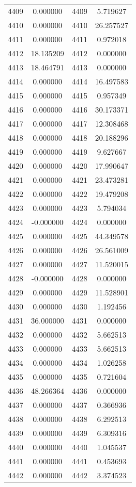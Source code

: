 \documentclass[12pt]{article}
\begin{document}
\begin{longtable}{@{}cccc@{}}
4409 & 0.000000 & 4409 & 5.719627 \\
4410 & 0.000000 & 4410 & 26.257527 \\
4411 & 0.000000 & 4411 & 0.972018 \\
4412 & 18.135209 & 4412 & 0.000000 \\
4413 & 18.464791 & 4413 & 0.000000 \\
4414 & 0.000000 & 4414 & 16.497583 \\
4415 & 0.000000 & 4415 & 0.957349 \\
4416 & 0.000000 & 4416 & 30.173371 \\
4417 & 0.000000 & 4417 & 12.308468 \\
4418 & 0.000000 & 4418 & 20.188296 \\
4419 & 0.000000 & 4419 & 9.627667 \\
4420 & 0.000000 & 4420 & 17.990647 \\
4421 & 0.000000 & 4421 & 23.473281 \\
4422 & 0.000000 & 4422 & 19.479208 \\
4423 & 0.000000 & 4423 & 5.794034 \\
4424 & -0.000000 & 4424 & 0.000000 \\
4425 & 0.000000 & 4425 & 44.349578 \\
4426 & 0.000000 & 4426 & 26.561009 \\
4427 & 0.000000 & 4427 & 11.520015 \\
4428 & -0.000000 & 4428 & 0.000000 \\
4429 & 0.000000 & 4429 & 11.528901 \\
4430 & 0.000000 & 4430 & 1.192456 \\
4431 & 36.000000 & 4431 & 0.000000 \\
4432 & 0.000000 & 4432 & 5.662513 \\
4433 & 0.000000 & 4433 & 5.662513 \\
4434 & 0.000000 & 4434 & 1.026258 \\
4435 & 0.000000 & 4435 & 0.721604 \\
4436 & 48.266364 & 4436 & 0.000000 \\
4437 & 0.000000 & 4437 & 0.366936 \\
4438 & 0.000000 & 4438 & 6.292513 \\
4439 & 0.000000 & 4439 & 6.309316 \\
4440 & 0.000000 & 4440 & 1.045537 \\
4441 & 0.000000 & 4441 & 0.453693 \\
4442 & 0.000000 & 4442 & 3.374523 \\

\end{longtable}
\end{document}
